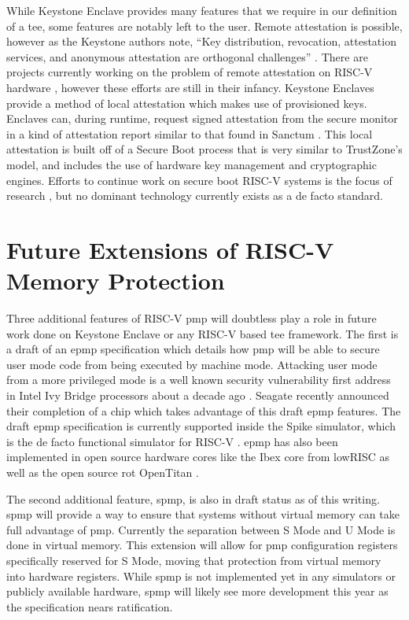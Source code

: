 While Keystone Enclave provides many features that we require in our definition of a \gls{tee}, some features are notably left to the user. Remote attestation is possible, however as the Keystone authors note, ``Key distribution, revocation, attestation services, and anonymous attestation are orthogonal challenges'' \cite{lee2019keystone}. There are projects currently working on the problem of remote attestation on RISC-V hardware \cite{shepherd2021lira}, however these efforts are still in their infancy. Keystone Enclaves provide a method of local attestation which makes use of provisioned keys. Enclaves can, during runtime, request signed attestation from the secure monitor in a kind of attestation report similar to that found in Sanctum \cite{lebedev2018secure}. This local attestation is built off of a Secure Boot process that is very similar to TrustZone's model, and includes the use of hardware key management and cryptographic engines. Efforts to continue work on secure boot RISC-V systems is the focus of research \cite{haj2019lightweight}, but no dominant technology currently exists as a de facto standard.

\section{Future Extensions of RISC-V Memory Protection}

Three additional features of RISC-V \gls{pmp} will doubtless play a role in future work done on Keystone Enclave or any RISC-V based \gls{tee} framework. The first is a draft of an \gls{epmp} specification which details how \gls{pmp} will be able to secure user mode code from being executed by machine mode. Attacking user mode from a more privileged mode is a well known security vulnerability first address in Intel Ivy Bridge processors about a decade ago \cite{6922075}. Seagate recently announced their completion of a chip which takes advantage of this draft \gls{epmp} features. The draft \gls{epmp} specification is currently supported inside the Spike simulator, which is the de facto functional simulator for RISC-V \cite{asanovic2016rocket}. \gls{epmp} has also been implemented in open source hardware cores like the Ibex core from lowRISC \cite{urlIbex} as well as the open source \gls{rot} OpenTitan \cite{guilley2021implementing}.

The second additional feature, \gls{spmp}, is also in draft status as of this writing. \gls{spmp} will provide a way to ensure that systems without virtual memory can take full advantage of \gls{pmp}. Currently the separation between S Mode and U Mode is done in virtual memory. This extension will allow for \gls{pmp} configuration registers specifically reserved for S Mode, moving that protection from virtual memory into hardware registers. While \gls{spmp} is not implemented yet in any simulators or publicly available hardware, \gls{spmp} will likely see more development this year as the specification nears ratification.

